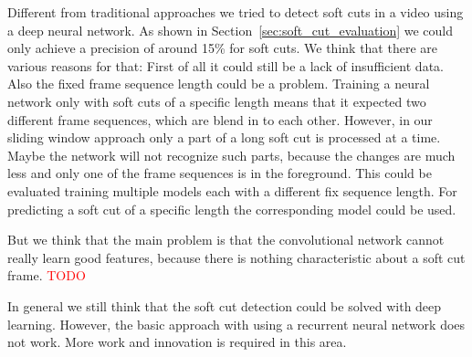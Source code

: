 Different from traditional approaches we tried to detect soft cuts in a video using a deep neural network.
As shown in Section~\ref{sec:soft_cut_evaluation} we could only achieve a precision of around 15\% for soft cuts.
We think that there are various reasons for that:
First of all it could still be a lack of insufficient data.
Also the fixed frame sequence length could be a problem.
Training a neural network only with soft cuts of a specific length means that it expected two different frame sequences, which are blend in to each other.
However, in our sliding window approach only a part of a long soft cut is processed at a time.
Maybe the network will not recognize such parts, because the changes are much less and only one of the frame sequences is in the foreground.
This could be evaluated training multiple models each with a different fix sequence length.
For predicting a soft cut of a specific length the corresponding model could be used.

But we think that the main problem is that the convolutional network cannot really learn good features, because there is nothing characteristic about a soft cut frame.
\textcolor{red}{TODO}

In general we still think that the soft cut detection could be solved with deep learning.
However, the basic approach with using a recurrent neural network does not work.
More work and innovation is required in this area.